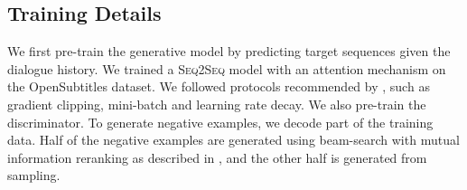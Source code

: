 \documentclass[11pt]{article}
\newcommand{\sts}{{{\textsc{Seq2Seq}}}\xspace}
\begin{document}
\subsection{Training Details}
We first  pre-train the generative model by predicting target sequences given the dialogue history. We trained a  \sts model
  \cite{sutskever2014sequence}   
 with an attention mechanism \cite{bahdanau2014neural,luong2015effective}  on the OpenSubtitles dataset. 
 We followed protocols recommended by , such as gradient clipping, mini-batch and learning rate decay.
We also pre-train the discriminator. To generate negative examples, 
we  decode   part of the training data. 
Half of the negative examples are generated using beam-search with mutual information reranking 
as described in ,
and the other half is generated from sampling. 




\begin{comment}
We add policy entropy $\nabla H(Y|X)$ to regularize the model  \cite{williams1991function,mnih2016asynchronous}. 
We also add an historical averaging term \cite{brown1951iterative,salimans2016improved} as a regularizer to smooth training:
 \begin{equation}
L= ||\theta-\frac{1}{t}\sum_{t}\theta_t ||^2
 \end{equation}
where $\theta_t$ denotes the value of the parameters at past time $t$. The historical average of the parameters is updated after each parameter update. 
\end{comment}
\end{document}
